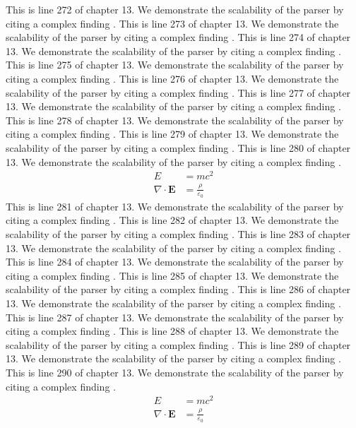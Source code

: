This is line 272 of chapter 13. We demonstrate the scalability of the parser by citing a complex finding \cite{ref13_272}.
This is line 273 of chapter 13. We demonstrate the scalability of the parser by citing a complex finding \cite{ref13_273}.
This is line 274 of chapter 13. We demonstrate the scalability of the parser by citing a complex finding \cite{ref13_274}.
This is line 275 of chapter 13. We demonstrate the scalability of the parser by citing a complex finding \cite{ref13_275}.
This is line 276 of chapter 13. We demonstrate the scalability of the parser by citing a complex finding \cite{ref13_276}.
This is line 277 of chapter 13. We demonstrate the scalability of the parser by citing a complex finding \cite{ref13_277}.
This is line 278 of chapter 13. We demonstrate the scalability of the parser by citing a complex finding \cite{ref13_278}.
This is line 279 of chapter 13. We demonstrate the scalability of the parser by citing a complex finding \cite{ref13_279}.
This is line 280 of chapter 13. We demonstrate the scalability of the parser by citing a complex finding \cite{ref13_280}.
\begin{align*}
  E &= mc^2 \\
  \nabla \cdot \mathbf{E} &= \frac{\rho}{\varepsilon_0}
\end{align*}
This is line 281 of chapter 13. We demonstrate the scalability of the parser by citing a complex finding \cite{ref13_281}.
This is line 282 of chapter 13. We demonstrate the scalability of the parser by citing a complex finding \cite{ref13_282}.
This is line 283 of chapter 13. We demonstrate the scalability of the parser by citing a complex finding \cite{ref13_283}.
This is line 284 of chapter 13. We demonstrate the scalability of the parser by citing a complex finding \cite{ref13_284}.
This is line 285 of chapter 13. We demonstrate the scalability of the parser by citing a complex finding \cite{ref13_285}.
This is line 286 of chapter 13. We demonstrate the scalability of the parser by citing a complex finding \cite{ref13_286}.
This is line 287 of chapter 13. We demonstrate the scalability of the parser by citing a complex finding \cite{ref13_287}.
This is line 288 of chapter 13. We demonstrate the scalability of the parser by citing a complex finding \cite{ref13_288}.
This is line 289 of chapter 13. We demonstrate the scalability of the parser by citing a complex finding \cite{ref13_289}.
This is line 290 of chapter 13. We demonstrate the scalability of the parser by citing a complex finding \cite{ref13_290}.
\begin{align*}
  E &= mc^2 \\
  \nabla \cdot \mathbf{E} &= \frac{\rho}{\varepsilon_0}
\end{align*}
